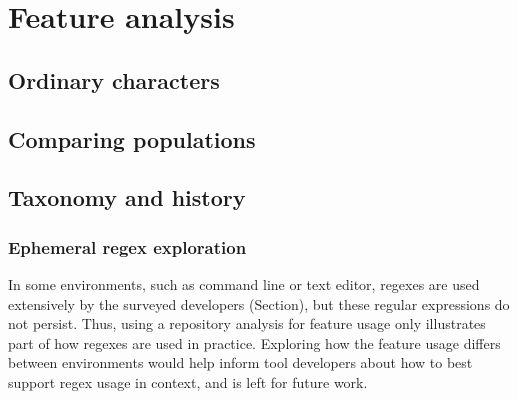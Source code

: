 \section{Feature analysis}

\subsection{Ordinary characters}

\subsection{Comparing populations}

\subsection{Taxonomy and history}

\subsubsection{Ephemeral regex exploration}
In some environments, such as command line or text editor, regexes are used extensively by the surveyed developers (Section), but these regular expressions do not persist. Thus, using a repository analysis for feature usage only illustrates part of how regexes are used in practice. Exploring how the feature usage differs between environments would help inform tool developers about how to best support regex usage in context, and is left for future work.

